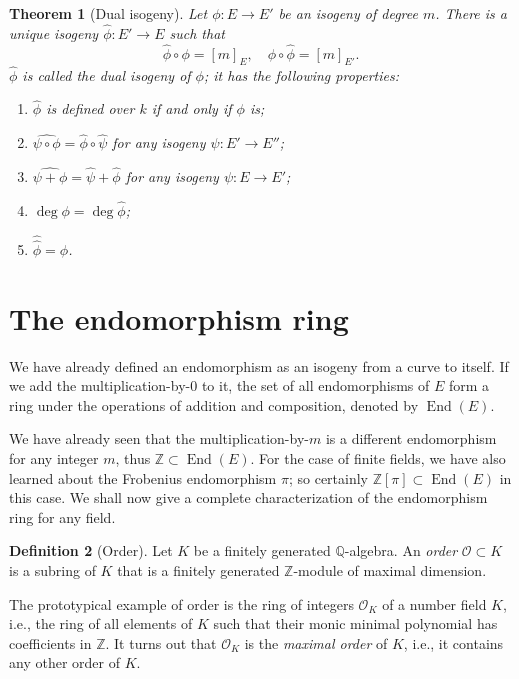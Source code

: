 \documentclass[10pt]{article}
\theoremstyle{plain}
\newtheorem{theorem}{Theorem}
\theoremstyle{definition}
\newtheorem{definition}[theorem]{Definition}
\DeclareMathOperator{\End}{End} %
\def\O{\ensuremath{\mathcal{O}}}
\begin{document}
\begin{theorem}[Dual isogeny]
  Let $ϕ:E\to E'$ be an isogeny of degree $m$. %
  There is a unique isogeny $\hat{ϕ}:E'\to E$ such that
  \[\hat{ϕ}∘ϕ = [m]_E, \quad ϕ∘\hat{ϕ} = [m]_{E'}.\] %
  $\hat{ϕ}$ is called the \emph{dual isogeny of $ϕ$}; it has the
  following properties:
  
  \begin{enumerate}
  \item $\hat{ϕ}$ is defined over $k$ if and only if $ϕ$ is;
  \item $\widehat{ψ∘ϕ} = \hat{ϕ}∘\hat{ψ}$ for any isogeny $ψ:E'\to E''$;
  \item $\widehat{ψ+ϕ} = \hat{ψ} + \hat{ϕ}$ for any isogeny $ψ:E\to E'$;
  \item $\deg ϕ = \deg\hat{ϕ}$;
  \item $\hat{\hat{ϕ}} = ϕ$.
  \end{enumerate}
\end{theorem}


\section{The endomorphism ring}

We have already defined an endomorphism as an isogeny from a curve to
itself. %
If we add the multiplication-by-$0$ to it, the set of all
endomorphisms of $E$ form a ring under the operations of addition and
composition, denoted by $\End(E)$. %

We have already seen that the multiplication-by-$m$ is a different
endomorphism for any integer $m$, thus $ℤ⊂\End(E)$. %
For the case of finite fields, we have also learned about the
Frobenius endomorphism $π$; so certainly $ℤ[π]⊂\End(E)$ in this
case. %
We shall now give a complete characterization of the endomorphism ring
for any field.

\begin{definition}[Order]
  Let $K$ be a finitely generated $ℚ$-algebra. %
  An \emph{order} $\O⊂K$ is a subring of $K$ that is a finitely
  generated $ℤ$-module of maximal dimension.
\end{definition}

The prototypical example of order is the ring of integers $\O_K$ of a
number field $K$, i.e., the ring of all elements of $K$ such that
their monic minimal polynomial has coefficients in $ℤ$. %
It turns out that $\O_K$ is the \emph{maximal order} of $K$, i.e., it
contains any other order of $K$.
\end{document}
